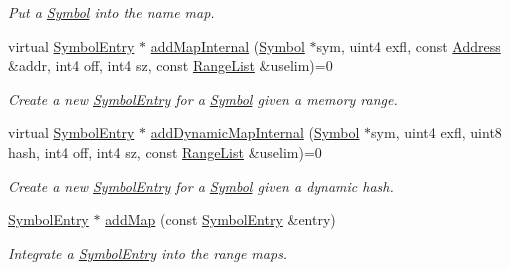 \begin{DoxyCompactItemize}
\begin{DoxyCompactList}\small\item\em Put a \mbox{\hyperlink{class_symbol}{Symbol}} into the name map. \end{DoxyCompactList}\item 
virtual \mbox{\hyperlink{class_symbol_entry}{Symbol\+Entry}} $\ast$ \mbox{\hyperlink{class_scope_aec0451f131ea214a174e00a434be36e9}{add\+Map\+Internal}} (\mbox{\hyperlink{class_symbol}{Symbol}} $\ast$sym, uint4 exfl, const \mbox{\hyperlink{class_address}{Address}} \&addr, int4 off, int4 sz, const \mbox{\hyperlink{class_range_list}{Range\+List}} \&uselim)=0
\begin{DoxyCompactList}\small\item\em Create a new \mbox{\hyperlink{class_symbol_entry}{Symbol\+Entry}} for a \mbox{\hyperlink{class_symbol}{Symbol}} given a memory range. \end{DoxyCompactList}\item 
virtual \mbox{\hyperlink{class_symbol_entry}{Symbol\+Entry}} $\ast$ \mbox{\hyperlink{class_scope_a5d3b5f792b07b023d43309472cd6f4d9}{add\+Dynamic\+Map\+Internal}} (\mbox{\hyperlink{class_symbol}{Symbol}} $\ast$sym, uint4 exfl, uint8 hash, int4 off, int4 sz, const \mbox{\hyperlink{class_range_list}{Range\+List}} \&uselim)=0
\begin{DoxyCompactList}\small\item\em Create a new \mbox{\hyperlink{class_symbol_entry}{Symbol\+Entry}} for a \mbox{\hyperlink{class_symbol}{Symbol}} given a dynamic hash. \end{DoxyCompactList}\item 
\mbox{\hyperlink{class_symbol_entry}{Symbol\+Entry}} $\ast$ \mbox{\hyperlink{class_scope_ab93f6dfecb978ac52b56f967896ca758}{add\+Map}} (const \mbox{\hyperlink{class_symbol_entry}{Symbol\+Entry}} \&entry)
\begin{DoxyCompactList}\small\item\em Integrate a \mbox{\hyperlink{class_symbol_entry}{Symbol\+Entry}} into the range maps. \end{DoxyCompactList}\end{DoxyCompactItemize}
